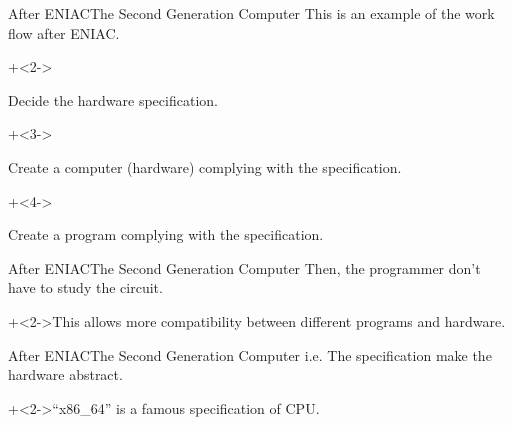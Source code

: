 \begin{frame}{After ENIAC}{The Second Generation Computer}
    This is an example of the work flow after ENIAC.
    \vspace{4ex}

    \begin{enumerate}
        \onslide+<2->{\item Decide the hardware specification.}
        \onslide+<3->{\item Create a computer (hardware) complying with the specification.}
        \onslide+<4->{\item Create a program complying with the specification.}
    \end{enumerate}
\end{frame}


\begin{frame}{After ENIAC}{The Second Generation Computer}
    Then, the programmer don't have to study the circuit.
    \vspace{4ex}

    \onslide+<2->{This allows more compatibility between different programs and hardware.}
\end{frame}


\begin{frame}{After ENIAC}{The Second Generation Computer}
    i.e. The specification make the hardware abstract.
    \vspace{4ex}

    \onslide+<2->{{\footnotesize ``x86\_64'' is a famous specification of CPU.}}
\end{frame}
